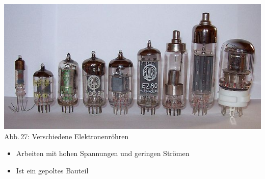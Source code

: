 \begin{frame}
	\begin{center}
		\includegraphics[width=\textwidth,height=.5\textheight,keepaspectratio]{a06/Roehren.jpg}\\
		{\tiny Abb.\,27: Verschiedene Elektronenröhren~\cite{wmde}}
	\end{center}
	\begin{itemize}
		\item Arbeiten mit hohen Spannungen und geringen Strömen
		\item Ist ein gepoltes Bauteil
	\end{itemize}
\end{frame}

